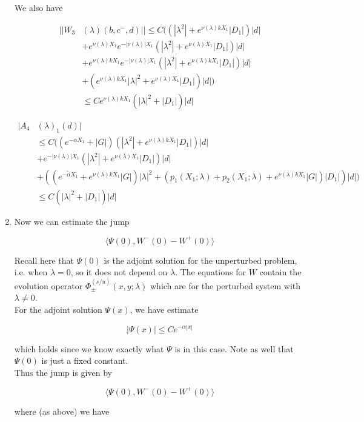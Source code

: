 \documentclass[12pt]{article}
\begin{document}
\begin{enumerate}
We also have

\begin{align*}
||W_3&(\lambda)(b,c^-,d)|| \leq C( (|\lambda^2| + e^{\nu(\lambda) k X_1}|D_1|)|d| \\
&+ e^{\nu(\lambda) X_1} e^{-|\nu(\lambda)| X_1} (|\lambda^2| + e^{\nu(\lambda) X_1}|D_1|)|d| \\
&+ e^{\nu(\lambda) k X_1} e^{-|\nu(\lambda)| X_1} (|\lambda^2| + e^{\nu(\lambda) k X_1}|D_1|)|d|\\
&+ (e^{\nu(\lambda)k X_1}|\lambda|^2 + e^{\nu(\lambda) X_1} |D_1|) |d| )\\
&\leq C e^{\nu(\lambda)k X_1} ( |\lambda|^2 + |D_1| )|d|
\end{align*}

\begin{align*}
|A_4&(\lambda)_1(d)| \\
&\leq C( (e^{-\alpha X_1} + |G|) (|\lambda^2| + e^{\nu(\lambda)k X_1}|D_1|)|d| \\ 
&+ e^{-|\nu(\lambda)| X_1} (|\lambda^2| + e^{\nu(\lambda)X_1}|D_1|)|d| \\
&+ ((e^{-\tilde{\alpha} X_1} + e^{\nu(\lambda)k X_1} |G|) |\lambda|^2 + (p_1(X_1; \lambda) + p_2(X_1; \lambda) + e^{\nu(\lambda) k X_1} |G|)|D_1|)|d| )\\
&\leq C(|\lambda|^2 + |D_1|) |d|
\end{align*}

\item Now we can estimate the jump

\[
\langle \Psi(0), W^-(0) - W^+(0) \rangle 
\]

Recall here that $\Psi(0)$ is the adjoint solution for the unperturbed problem, i.e. when $\lambda = 0$, so it does not depend on $\lambda$. The equations for $W$ contain the evolution operator $\Phi^{(s/u)}_\pm(x, y; \lambda)$ which are for the perturbed system with $\lambda \neq 0$.\\

For the adjoint solution $\Psi(x)$, we have estimate 

\[
|\Psi(x)| \leq C e^{-\alpha|x|}
\]

which holds since we know exactly what $\Psi$ is in this case. Note as well that $\Psi(0)$ is just a fixed constant.\\

Thus the jump is given by

\[
\langle \Psi(0), W^-(0) - W^+(0) \rangle 
\]

where (as above) we have


\end{enumerate}
\end{document}
